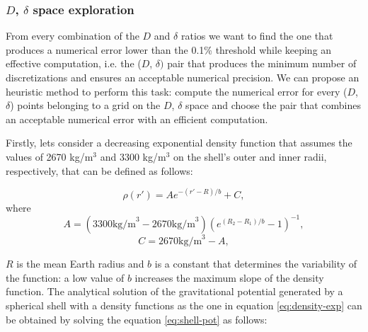 \documentclass[extra]{gji}
\begin{document}
\subsubsection{$D$, $\delta$ space exploration}

From every combination of the $D$ and $\delta$ ratios we want to find
the one that produces a numerical error lower than the 0.1\% threshold
while keeping an effective computation, i.e. the ($D$, $\delta)$ pair
that produces the minimum number of discretizations and ensures an
acceptable numerical precision.
We can propose an heuristic method to perform this task: compute the
numerical error for every ($D$, $\delta$) points belonging to a grid on
the $D$, $\delta$ space and choose the pair that combines an
acceptable numerical error with an efficient computation.

Firstly, lets consider a decreasing exponential density function that
assumes the values of 2670 kg/m$^3$ and 3300 kg/m$^3$ on the shell's
outer and inner radii, respectively, that can be defined as follows:

\begin{equation}
    \rho(r') = A e^{-(r' - R)/b} + C,
\label{eq:density-exp}
\end{equation}
\noindent where
\begin{equation}
    A =
    (3300 \text{kg/m}^3 - 2670 \text{kg/m}^3)
    \left( e^{( R_2 - R_1 )/b} - 1 \right)^{-1},
\end{equation}
\begin{equation}
    C =
    2670 \text{kg/m}^3 - A,
\end{equation}

\noindent $R$ is the mean Earth radius and $b$ is a constant
that determines the variability of the function: a low value of $b$
increases the maximum slope of the density function.
The analytical solution of the gravitational potential generated by a
spherical shell with a density functions as the one in equation
\ref{eq:density-exp} can be obtained by solving the equation
\ref{eq:shell-pot} as follows:

\end{document}
